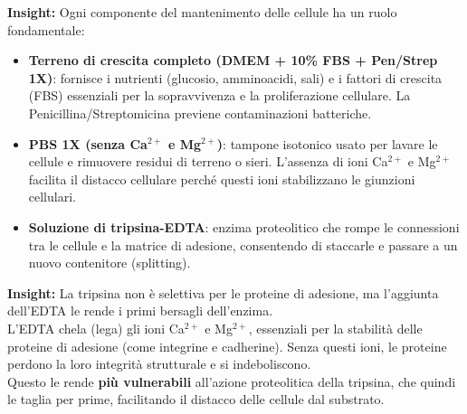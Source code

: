 \begin{insightBox}
  \textbf{Insight:} Ogni componente del mantenimento delle cellule ha un ruolo fondamentale:
  \begin{itemize}\footnotesize
    \item \textbf{Terreno di crescita completo (DMEM + 10\% FBS + Pen/Strep 1X)}: fornisce i nutrienti (glucosio, amminoacidi, sali) e i fattori di crescita (FBS) essenziali per la sopravvivenza e la proliferazione cellulare. La Penicillina/Streptomicina previene contaminazioni batteriche.
    \item \textbf{PBS 1X (senza Ca$^{2+}$ e Mg$^{2+}$)}: tampone isotonico usato per lavare le cellule e rimuovere residui di terreno o sieri. L’assenza di ioni Ca$^{2+}$ e Mg$^{2+}$ facilita il distacco cellulare perché questi ioni stabilizzano le giunzioni cellulari.
    \item \textbf{Soluzione di tripsina-EDTA}: enzima proteolitico che rompe le connessioni tra le cellule e la matrice di adesione, consentendo di staccarle e passare a un nuovo contenitore (splitting).
  \end{itemize}
\end{insightBox}

\begin{insightBox}
  \textbf{Insight:} La tripsina non è selettiva per le proteine di adesione, ma l’aggiunta dell’EDTA le rende i primi bersagli dell’enzima.\\
  L’EDTA chela (lega) gli ioni Ca$^{2+}$ e Mg$^{2+}$, essenziali per la stabilità delle proteine di adesione (come integrine e cadherine). Senza questi ioni, le proteine perdono la loro integrità strutturale e si indeboliscono.\\
  Questo le rende \textbf{più vulnerabili} all’azione proteolitica della tripsina, che quindi le taglia per prime, facilitando il distacco delle cellule dal substrato.
\end{insightBox}


\newpage


